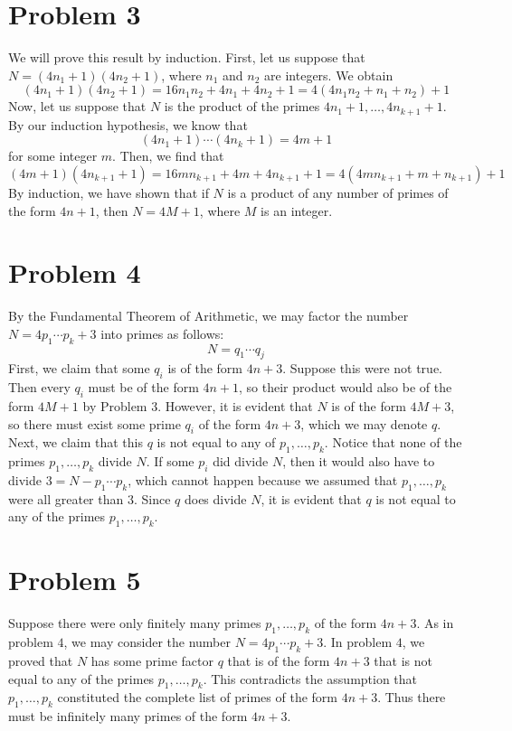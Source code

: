 \documentclass[12pt]{article}
\begin{document}
\section*{Problem 3}
We will prove this result by induction. First, let us suppose that $N = (4n_1+1)(4n_2+1)$, where $n_1$ and $n_2$ are integers. We obtain
\[
(4n_1+1)(4n_2+1) = 16n_1n_2 + 4n_1 + 4n_2 + 1 = 4(4n_1n_2 + n_1 + n_2) + 1
\] Now, let us suppose that $N$ is the product of the primes $4n_1+1,\ldots,4n_{k+1}+1$. By our induction hypothesis, we know that
\[
(4n_1+1)\cdots(4n_k+1) = 4m+1
\] for some integer $m$. Then, we find that
\[
(4m+1)(4n_{k+1}+1) = 16mn_{k+1} + 4m + 4n_{k+1} + 1 = 4(4mn_{k+1}+m+n_{k+1})+1
\] By induction, we have shown that if $N$ is a product of any number of primes of the form $4n+1$, then $N = 4M+1$, where $M$ is an integer.
\newpage
\section*{Problem 4}
By the Fundamental Theorem of Arithmetic, we may factor the number $N= 4p_1\cdots p_k + 3$ into primes as follows:
\[N = q_1\cdots q_j\]
First, we claim that some $q_i$ is of the form $4n+3$. Suppose this were not true. Then every $q_i$ must be of the form $4n+1$, so their product would also be of the form $4M+1$ by Problem $3$. However, it is evident that $N$ is of the form $4M+3$, so there must exist some prime $q_i$ of the form $4n+3$, which we may denote $q$. Next, we claim that this $q$ is not equal to any of $p_1,\ldots,p_k$. Notice that none of the primes $p_1,\ldots,p_k$ divide $N$. If some $p_i$ did divide $N$, then it would also have to divide $3= N - p_1\cdots p_k$, which cannot happen because we assumed that $p_1,\ldots,p_k$ were all greater than $3$. Since $q$ does divide $N$, it is evident that $q$ is not equal to any of the primes $p_1,\ldots,p_k$.
\newpage
\section*{Problem 5}
Suppose there were only finitely many primes $p_1,\ldots,p_{k}$ of the form $4n+3$. As in problem $4$, we may consider the number $N = 4p_1\cdots p_k + 3$. In problem $4$, we proved that $N$ has some prime factor $q$ that is of the form $4n+3$ that is not equal to any of the primes $p_1,\ldots,p_k$. This contradicts the assumption that $p_1,\ldots,p_k$ constituted the complete list of primes of the form $4n+3$. Thus there must be infinitely many primes of the form $4n+3$.
\newpage
\end{document}
